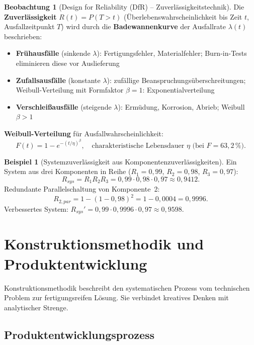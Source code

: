 ﻿\documentclass[a4paper,12pt]{report}
\theoremstyle{definition}
\newtheorem{beispiel}{Beispiel}
\newtheorem{beobachtung}{Beobachtung}
\begin{document}
\begin{beobachtung}[Design for Reliability (DfR) -- Zuverlässigkeitstechnik]
Die \textbf{Zuverlässigkeit} $R(t) = P(T > t)$ (Überlebenswahrscheinlichkeit
bis Zeit $t$, Ausfallzeitpunkt $T$) wird durch die \textbf{Badewannenkurve}
der Ausfallrate $\lambda(t)$ beschrieben:
\begin{itemize}
    \item[-] \textbf{Frühausfälle} (sinkende $\lambda$): Fertigungsfehler, Materialfehler;
          Burn-in-Tests eliminieren diese vor Auslieferung
    \item[-] \textbf{Zufallsausfälle} (konstante $\lambda$): zufällige Beanspruchungsüberschreitungen;
          Weibull-Verteilung mit Formfaktor $\beta = 1$: Exponentialverteilung
    \item[-] \textbf{Verschleißausfälle} (steigende $\lambda$): Ermüdung, Korrosion, Abrieb;
          Weibull $\beta > 1$
\end{itemize}
\textbf{Weibull-Verteilung} für Ausfallwahrscheinlichkeit:
\[
  F(t) = 1 - e^{-(t/\eta)^\beta},
  \quad \text{charakteristische Lebensdauer } \eta \text{ (bei } F = 63{,}2\,\%).
\]
\end{beobachtung}

\begin{beispiel}[Systemzuverlässigkeit aus Komponentenzuverlässigkeiten]
Ein System aus drei Komponenten in Reihe ($R_1 = 0{,}99$, $R_2 = 0{,}98$, $R_3 = 0{,}97$):
\[
  R_{sys} = R_1 R_2 R_3 = 0{,}99 \cdot 0{,}98 \cdot 0{,}97 \approx 0{,}9412.
\]
Redundante Parallelschaltung von Komponente~2:
\[
  R_{2,par} = 1 - (1-0{,}98)^2 = 1 - 0{,}0004 = 0{,}9996.
\]
Verbessertes System: $R_{sys}' = 0{,}99 \cdot 0{,}9996 \cdot 0{,}97 \approx 0{,}9598$.
\end{beispiel}

\chapter{Konstruktionsmethodik und Produktentwicklung}

Konstruktionsmethodik beschreibt den systematischen Prozess vom
technischen Problem zur fertigungsreifen Lösung. Sie verbindet
kreatives Denken mit analytischer Strenge.

\section{Produktentwicklungsprozess}
\end{document}
